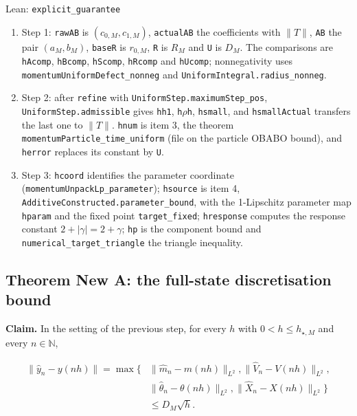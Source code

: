 \documentclass[11pt,a4paper]{report}
\begin{document}
\begin{leanbox}{Lean: \texttt{explicit\_\allowbreak{}guarantee}}
\begin{enumerate}
\item Step 1: \texttt{raw\allowbreak{}AB} is \((c_{0,M},c_{1,M})\), \texttt{actual\allowbreak{}AB} the coefficients with \(\|T\|\), \texttt{AB} the pair \((a_M,b_M)\), \texttt{base\allowbreak{}R} is \(r_{0,M}\), \texttt{R} is \(R_M\) and \texttt{U} is \(D_M\). The comparisons are \texttt{h\allowbreak{}Acomp}, \texttt{h\allowbreak{}Bcomp}, \texttt{h\allowbreak{}Scomp}, \texttt{h\allowbreak{}Rcomp} and \texttt{h\allowbreak{}Ucomp}; nonnegativity uses \texttt{momentum\allowbreak{}Uniform\allowbreak{}Defect\_\allowbreak{}nonneg} and \texttt{Uniform\allowbreak{}Integral.\allowbreak{}radius\_\allowbreak{}nonneg}.

\item Step 2: after \texttt{refine} with \texttt{Uniform\allowbreak{}Step.\allowbreak{}maximum\allowbreak{}Step\_\allowbreak{}pos}, \texttt{Uniform\allowbreak{}Step.\allowbreak{}admissible} gives \texttt{hh1}, \texttt{h\ensuremath{\rho}h}, \texttt{hsmall}, and \texttt{hsmall\allowbreak{}Actual} transfers the last one to \(\|T\|\). \texttt{hnum} is item 3, the theorem \texttt{momentum\allowbreak{}Particle\_\allowbreak{}time\_\allowbreak{}uniform} (file on the particle OBABO bound), and \texttt{herror} replaces its constant by \texttt{U}.

\item Step 3: \texttt{hcoord} identifies the parameter coordinate (\texttt{momentum\allowbreak{}Unpack\allowbreak{}Lp\_\allowbreak{}parameter}); \texttt{hsource} is item 4, \texttt{Additive\allowbreak{}Constructed.\allowbreak{}parameter\_\allowbreak{}bound}, with the 1-Lipschitz parameter map \texttt{hparam} and the fixed point \texttt{target\_\allowbreak{}fixed}; \texttt{hresponse} computes the response constant \(2+|\gamma|=2+\gamma\); \texttt{hp} is the component bound and \texttt{numerical\_\allowbreak{}target\_\allowbreak{}triangle} the triangle inequality.

\end{enumerate}
\end{leanbox}
\subsection{\texorpdfstring{Theorem New A: the full-state discretisation bound}{Theorem New A: the full-state discretisation bound}}


\textbf{Claim.} In the setting of the previous step, for every \(h\) with \(0<h\le h_{\star,M}\) and every \(n\in\mathbb N\),


\[\begin{aligned}\|\hat y_n-y(nh)\|=\max\bigl\{&\|\hat m_n-m(nh)\|_{L^2},\|\hat V_n-V(nh)\|_{L^2},\\&\|\hat\theta_n-\theta(nh)\|_{L^2},\|\hat X_n-X(nh)\|_{L^2}\bigr\}\\&\le D_M\sqrt h.\end{aligned}\]
\end{document}
